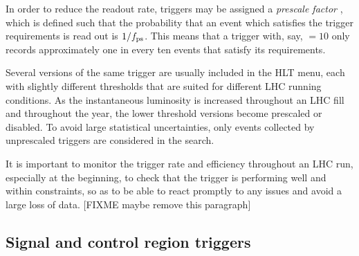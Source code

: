 In order to reduce the readout rate, triggers may be assigned a 
\textit{prescale factor} \prescale, which is defined such that the probability 
that an event which satisfies the trigger requirements is read out is 
$1/f_{\text{ps}}$. This means that a trigger with, say, \prescale$=10$ only records 
approximately one in every ten events that satisfy its requirements.

Several versions of the same trigger are usually included in the HLT menu, each 
with slightly different thresholds that are suited for different LHC running 
conditions. As the instantaneous luminosity is increased throughout an LHC fill 
and throughout the year, the lower threshold versions become prescaled or 
disabled. To avoid large statistical uncertainties, only events collected by 
unprescaled triggers are considered in the search.

It is important to monitor the trigger rate and efficiency throughout an LHC 
run, especially at the beginning, to check that the trigger is performing well 
and within constraints, so as to be able to react promptly to any issues and 
avoid a large loss of data. [FIXME maybe remove this paragraph]



\subsection{Signal and control region triggers}

